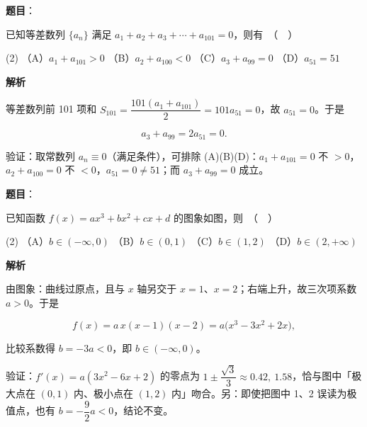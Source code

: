 \begin{answer}

\textbf{题目}：

已知等差数列 $\{a_n\}$ 满足 $a_1 + a_2 + a_3 + \cdots + a_{101} = 0$，则有　（　）

\begin{gkopts}(2)
\task （A）$a_1 + a_{101} > 0$
\task （B）$a_2 + a_{100} < 0$
\task （C）$a_3 + a_{99} = 0$
\task （D）$a_{51} = 51$
\end{gkopts}

\textbf{解析}

等差数列前 101 项和 $S_{101}=\dfrac{101(a_1+a_{101})}{2}=101a_{51}=0$，故 $a_{51}=0$。于是

\nopagebreak[4]
\[a_3+a_{99}=2a_{51}=0 .\]

验证：取常数列 $a_n\equiv0$（满足条件），可排除 (A)(B)(D)：$a_1+a_{101}=0$ 不 $>0$，$a_2+a_{100}=0$ 不 $<0$，$a_{51}=0\ne51$；而 $a_3+a_{99}=0$ 成立。


\par\medskip

\end{answer}
\begin{answer}

\textbf{题目}：

已知函数 $f(x) = ax^3 + bx^2 + cx + d$ 的图象如图，则　（　）
\nopagebreak[4]
\begin{center}\end{center}
\nopagebreak[4]
\begin{gkopts}(2)
\task （A）$b \in (-\infty, 0)$
\task （B）$b \in (0, 1)$
\task （C）$b \in (1, 2)$
\task （D）$b \in (2, +\infty)$
\end{gkopts}

\textbf{解析}

由图象：曲线过原点，且与 $x$ 轴另交于 $x=1$、$x=2$；右端上升，故三次项系数 $a>0$。于是

\nopagebreak[4]
\[f(x)=a\,x(x-1)(x-2)=a\big(x^3-3x^2+2x\big),\]

比较系数得 $b=-3a<0$，即 $b\in(-\infty,0)$。

验证：$f'(x)=a(3x^2-6x+2)$ 的零点为 $1\pm\dfrac{\sqrt3}{3}\approx0.42,\ 1.58$，恰与图中「极大点在 $(0,1)$ 内、极小点在 $(1,2)$ 内」吻合。另：即使把图中 1、2 误读为极值点，也有 $b=-\dfrac92a<0$，结论不变。


\par\medskip

\end{answer}
